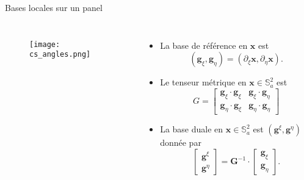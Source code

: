 \documentclass[11pt]{beamer}
\begin{document}
\begin{frame}{Bases locales sur un panel}
\begin{columns}
\begin{figure}[htbp]
\begin{center}
\texttt{[image: cs\_angles.png]}
\end{center}
\end{figure}
\begin{itemize}
\item La base de référence en $\mathbf{x}$ est $$(\mathbf{g}_{\xi}, \mathbf{g}_{\eta}) = (\partial_{\xi} \mathbf{x}, \partial_{\eta} \mathbf{x}).$$
\item Le tenseur métrique en $\mathbf{x} \in \mathbb{S}_a^2$ est
\begin{equation*}
G=\begin{bmatrix}
\mathbf{g}_{\xi} \cdot \mathbf{g}_{\xi} & \mathbf{g}_{\xi} \cdot \mathbf{g}_{\eta} \\
\mathbf{g}_{\eta} \cdot \mathbf{g}_{\xi} & \mathbf{g}_{\eta} \cdot \mathbf{g}_{\eta} 
\end{bmatrix}
\end{equation*}
\item La base duale en $\mathbf{x} \in \mathbb{S}^2_a $ est $(\mathbf{g}^\xi,\mathbf{g}^\eta)$ donnée par
$$
\begin{bmatrix}
\mathbf{g}^{\xi} \\ \mathbf{g}^{\eta} 
\end{bmatrix}
=
\mathbf{G}^{-1} \cdot
\begin{bmatrix}
\mathbf{g}_{\xi} \\ \mathbf{g}_{\eta} 
\end{bmatrix}.
$$
\end{itemize}
\end{columns}
\end{frame}
\end{document}
